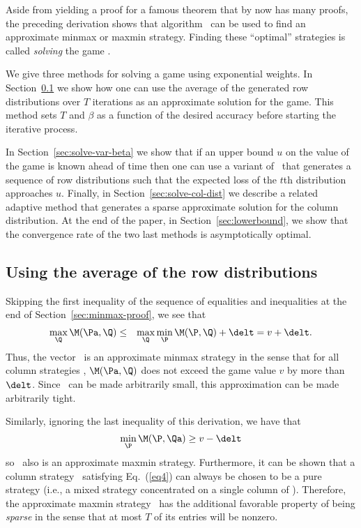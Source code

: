 Aside from yielding a proof for a famous theorem that by now has many
proofs, the preceding derivation shows that algorithm \lwalg\ can be
used to find an approximate minmax or maxmin strategy.
Finding these ``optimal'' strategies is called {\em solving\/} the
game \M.

We give three methods for solving a game using exponential weights. In
Section~\ref{sec:solve-fix-beta} we show how one can use the average
of the generated row distributions over $T$ iterations as an
approximate solution for the game. This method sets $T$ and $\beta$ as
a function of the desired accuracy before starting the iterative process.

In Section~\ref{sec:solve-var-beta} we show that if an upper bound $u$
on the value of the game is known ahead of time then one can use a
variant of \lwalg\ that generates a sequence of row distributions
such that the expected loss of the $t$th distribution approaches $u$.
Finally, in Section~\ref{sec:solve-col-dist} we describe a related
adaptive method that generates a sparse approximate solution for the
column distribution.
At the end of the paper, in Section~\ref{sec:lowerbound}, we show
that the convergence rate of the two last methods is asymptotically
optimal.

\subsection{Using the average of the row distributions}
\label{sec:solve-fix-beta}

Skipping the first inequality of the sequence of equalities and
inequalities at the end of Section~\ref{sec:minmax-proof}, 
we see that
{\em
\begin{eqnarray*}
 \maxq \M(\Pa,\Q) &\leq& \maxq \minp \M(\P,\Q) + \delt 
       = v + \delt.
\end{eqnarray*}
}%
Thus, the vector \Pa\ is an approximate minmax strategy in the sense
that for all column strategies \Q, $\M(\Pa,\Q)$ does not exceed the
game value $v$ by more than $\delt$.
Since \delt\ can be made arbitrarily small, this approximation can be
made arbitrarily tight.

Similarly, ignoring the last inequality of this derivation, we have
that
{\em
\[ \minp \M(\P,\Qa) \geq v - \delt \]
}%
so \Qa\ also is an approximate maxmin strategy.
Furthermore, it can be shown that a column strategy \Qt\ satisfying
Eq.~(\ref{eq4}) can always be chosen to be a pure strategy (i.e., a
mixed strategy concentrated on a single column of \M).
Therefore, the approximate maxmin strategy \Qa\ has the additional
favorable property of being {\em sparse\/} in the sense that at most
$T$ of its entries will be nonzero.

